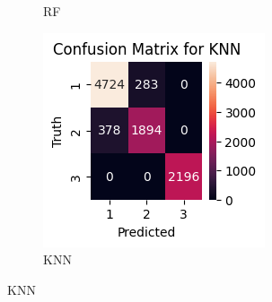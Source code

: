 \documentclass[conference]{IEEEtran}
\begin{document}
\begin{figure}[!t]
\begin{subfigure}[b]{0.32\columnwidth}
        \caption{RF}\label{fig:cm_rf}
    \end{subfigure}
    \hfill
    \begin{subfigure}[b]{0.32\columnwidth}
        \includegraphics[width=\textwidth]{confusion_matrix_knn.png}
        \caption{KNN}\label{fig:cm_knn}
    \end{subfigure}
    \medskip
    

\end{figure}
\end{document}
